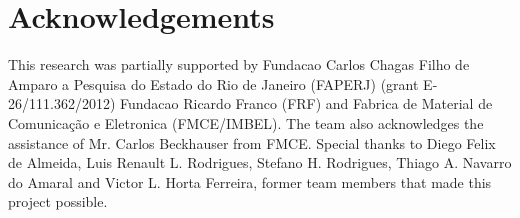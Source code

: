 \section*{Acknowledgements}

This research was partially supported by Fundacao Carlos Chagas Filho de Amparo
a Pesquisa do Estado do Rio de Janeiro (FAPERJ) (grant E-26/111.362/2012)
Fundacao Ricardo Franco (FRF) and Fabrica de Material de Comunicação e
Eletronica (FMCE/IMBEL). The team also acknowledges the assistance of Mr.
Carlos Beckhauser from FMCE. Special thanks to Diego Felix de Almeida, Luis
Renault L. Rodrigues, Stefano H. Rodrigues, Thiago A. Navarro do Amaral and
Victor L. Horta Ferreira, former team members that made this project possible.

